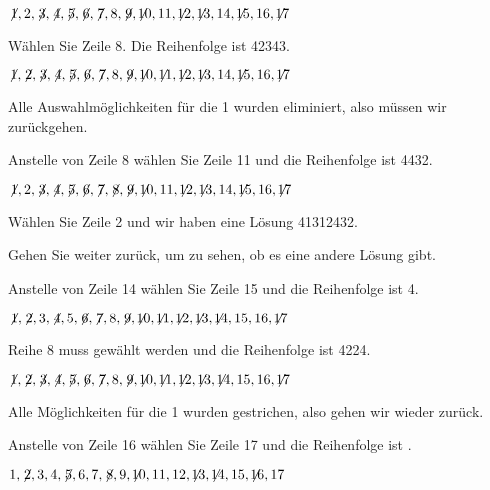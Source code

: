$\not\! 1,2,\not\! 3,\not\! 4,\not\! 5,\not\! 6,\not\! 7,8,\not\! 9,\not\!\! 10,11,\not\!\! 12,\not\!\! 13,14, \not\!\! 15,16,\not\!\! 17$

\noindent Wählen Sie Zeile 8. Die Reihenfolge ist 4{}2{}34{}3\textvisiblespace.

$\not\! 1,\not\! 2,\not\! 3,\not\! 4,\not\! 5,\not\! 6,\not\! 7,8,\not\! 9,\not\!\! 10,\not\!\! 11,\not\!\! 12,\not\!\! 13,14, \not\!\! 15,16,\not\!\! 17$

\noindent Alle Auswahlmöglichkeiten für die 1 wurden eliminiert, also müssen wir zurückgehen.

\smallskip

\noindent Anstelle von Zeile 8 wählen Sie Zeile 11 und die Reihenfolge ist 44{}3{}2.


$\not\! 1,2,\not\! 3,\not\! 4,\not\! 5,\not\! 6,\not\! 7,\not\! 8,\not\! 9,\not\!\! 10,11,\not\!\! 12,\not\!\! 13,14, \not\!\! 15,16,\not\!\! 17$

\noindent Wählen Sie Zeile 2 und wir haben eine Lösung 4{}1{}3{}1{}2{}4{}3{}2.

\smallskip

\noindent Gehen Sie weiter zurück, um zu sehen, ob es eine andere Lösung gibt.

\smallskip

\noindent Anstelle von Zeile 14 wählen Sie Zeile 15 und die Reihenfolge ist 4\textvisiblespace {}.

$\not\! 1,\not\! 2,3,\not\! 4,5,\not\! 6,\not\! 7,8,\not\! 9,\not\!\! 10,\not\!\! 11,\not\!\! 12,\not\!\! 13,\not\!\! 14,15,16,\not\!\! 17$

\noindent Reihe 8 muss gewählt werden und die Reihenfolge ist 4{}22{}4.

$\not\! 1,\not\! 2,\not\! 3,\not\! 4,\not\! 5,\not\! 6,\not\! 7,8,\not\! 9,\not\!\! 10,\not\!\! 11,\not\!\! 12,\not\!\! 13,\not\!\! 14,15,16,\not\!\! 17$

\noindent Alle Möglichkeiten für die 1 wurden gestrichen, also gehen wir wieder zurück.

\smallskip

\noindent Anstelle von Zeile 16 wählen Sie Zeile 17 und die Reihenfolge ist \textvisiblespace \textvisiblespace \textvisiblespace{}\textvisiblespace.

$1,\not\! 2,3,4,\not\! 5,6,7,\not\! 8,9,\not\!\! 10,11,12,\not\!\! 13,\not\!\! 14,15,\not\!\! 16,17$


